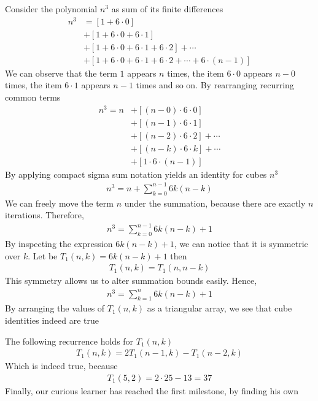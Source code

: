 Consider the polynomial $n^3$ as sum of its finite differences
\begin{align*}
    n^3
    &= [1+6\cdot0] \\
    &+ [1+6\cdot0+6\cdot1] \\
    &+ [1+6\cdot0+6\cdot1+6\cdot2] + \cdots \\
    &+ [1+6\cdot0+6\cdot1+6\cdot2+\cdots+6\cdot(n-1)]
\end{align*}
We can observe that the term $1$ appears $n$ times, the item $6\cdot0$ appears $n-0$ times,
the item $6\cdot1$ appears $n-1$ times and so on.
By rearranging recurring common terms
\begin{align*}
    n^3 = n
    &+ [(n-0) \cdot 6 \cdot 0] \\
    &+ [(n-1)\cdot6\cdot1] \\
    &+ [(n-2)\cdot6\cdot2] + \cdots \\
    &+ [(n-k)\cdot 6 \cdot k] + \cdots \\
    &+ [1\cdot6\cdot(n-1)]
\end{align*}
By applying compact sigma sum notation yields an identity for cubes $n^3$
\begin{align*}
    n^3 = n + \sum_{k=0}^{n-1} 6k(n-k)
\end{align*}
We can freely move the term $n$ under the summation, because there are exactly $n$ iterations.
Therefore,
\begin{align*}
    n^3 = \sum_{k=0}^{n-1} 6k(n-k) + 1
\end{align*}
By inspecting the expression $6k(n-k) + 1$, we can notice that it is symmetric over $k$.
Let be $T_{1} (n,k) = 6k(n-k) + 1$ then
\begin{align*}
    T_{1} (n,k) = T_{1} (n,n-k)
\end{align*}
This symmetry allows us to alter summation bounds easily.
Hence,
\begin{align*}
    n^3 = \sum_{k=1}^{n} 6k(n-k) + 1
\end{align*}
By arranging the values of $T_{1} (n,k)$ as a triangular array, we see that cube identities indeed are true

The following recurrence holds for $T_{1} (n,k)$
\begin{align*}
    T_{1} (n, k) = 2T_{1} (n-1, k) - T_{1} (n-2, k)
\end{align*}
Which is indeed true, because
\begin{align*}
    T_{1} (5, 2) = 2 \cdot 25 - 13 = 37
\end{align*}
Finally, our curious learner has reached the first milestone, by finding his own
